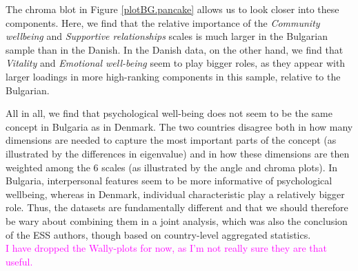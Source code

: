 \documentclass[titlepage,11pt,twoside]{article}
\newcommand{\hl}[1]{\textcolor{magenta}{#1}}
\begin{document}
 The chroma blot in Figure \ref{plotBG.pancake} allows us to look closer into these components. Here, we find that the relative importance of the \textit{Community wellbeing} and \textit{Supportive relationships} scales is much larger in the Bulgarian sample than in the Danish. In the Danish data, on the other hand, we find that \textit{Vitality} and \textit{Emotional well-being} seem to play bigger roles, as they appear with larger loadings in more high-ranking components in this sample, relative to the Bulgarian.

All in all, we find that psychological well-being does not seem to be the same concept in Bulgaria as in Denmark. The two countries disagree both in how many dimensions are needed to capture the most important parts of the concept (as illustrated by the differences in eigenvalue) and in how these dimensions are then weighted among the 6 scales (as illustrated by the angle and chroma plots). In Bulgaria, interpersonal features seem to be more informative of psychological wellbeing, whereas in Denmark, individual characteristic play a relatively bigger role. Thus, the datasets are fundamentally different and that we should therefore be wary about combining them in a joint analysis, which was also the conclusion of the ESS authors, though based on country-level aggregated statistics. \\

\hl{I have dropped the Wally-plots for now, as I'm not really sure they are that useful.}



\end{document}

